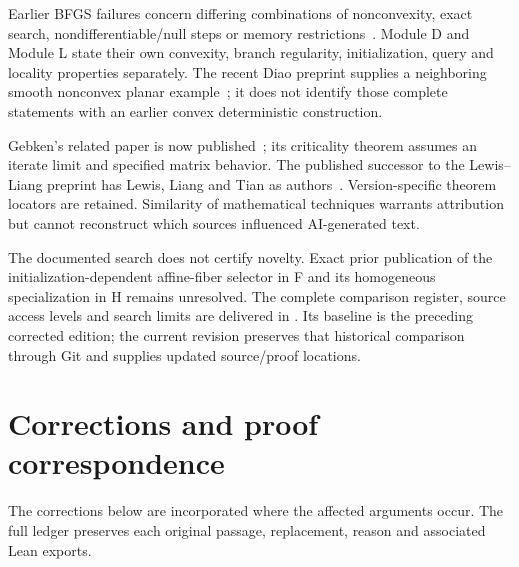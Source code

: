 Earlier BFGS failures concern differing combinations of nonconvexity, exact search, nondifferentiable/null steps or memory restrictions~\cite{NEG_LO08,NEG_M07,NEG_LZ15,NEG_AO21}. Module D and Module L state their own convexity, branch regularity, initialization, query and locality properties separately. The recent Diao preprint supplies a neighboring smooth nonconvex planar example~\cite{NEG_DIAO26}; it does not identify those complete statements with an earlier convex deterministic construction.

Gebken's related paper is now published~\cite{BG}; its criticality theorem assumes an iterate limit and specified matrix behavior. The published successor to the Lewis--Liang preprint has Lewis, Liang and Tian as authors~\cite{LL}. Version-specific theorem locators are retained. Similarity of mathematical techniques warrants attribution but cannot reconstruct which sources influenced AI-generated text.

The documented search does not certify novelty. Exact prior publication of the initialization-dependent affine-fiber selector in F and its homogeneous specialization in H remains unresolved. The complete comparison register, source access levels and search limits are delivered in . Its baseline is the preceding corrected edition; the current revision preserves that historical comparison through Git and supplies updated source/proof locations.

\chapter*{Corrections and proof correspondence}
The corrections below are incorporated where the affected arguments occur. The full ledger preserves each original passage, replacement, reason and associated Lean exports.

